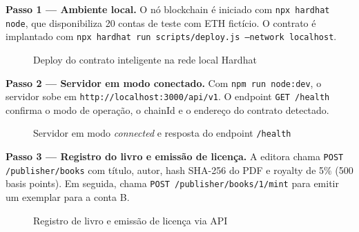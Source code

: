 \documentclass[12pt]{article}
\begin{document}
\textbf{Passo 1 — Ambiente local.} O nó blockchain é iniciado com \texttt{npx hardhat node}, que disponibiliza 20 contas de teste com ETH fictício. O contrato é implantado com \texttt{npx hardhat run scripts/deploy.js --network localhost}.

\begin{figure}[H]
\centering
\caption{Deploy do contrato inteligente na rede local Hardhat}
\label{fig:deploy}
\end{figure}

\textbf{Passo 2 — Servidor em modo conectado.} Com \texttt{npm run node:dev}, o servidor sobe em \texttt{http://localhost:3000/api/v1}. O endpoint \texttt{GET /health} confirma o modo de operação, o chainId e o endereço do contrato detectado.

\begin{figure}[H]
\centering
\caption{Servidor em modo \textit{connected} e resposta do endpoint \texttt{/health}}
\label{fig:health}
\end{figure}

\textbf{Passo 3 — Registro do livro e emissão de licença.} A editora chama \texttt{POST /publisher/books} com título, autor, hash SHA-256 do PDF e royalty de 5\% (500 basis points). Em seguida, chama \texttt{POST /publisher/books/1/mint} para emitir um exemplar para a conta B.

\begin{figure}[H]
\centering
\caption{Registro de livro e emissão de licença via API}
\label{fig:mint}
\end{figure}
\end{document}
